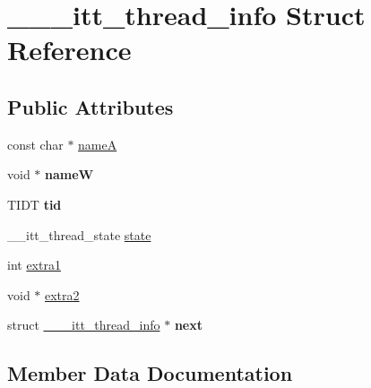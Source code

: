 \hypertarget{struct______itt__thread__info}{}\section{\+\_\+\+\_\+\+\_\+itt\+\_\+thread\+\_\+info Struct Reference}
\label{struct______itt__thread__info}
\subsection*{Public Attributes}
\begin{DoxyCompactItemize}
\item 
const char $\ast$ \hyperlink{struct______itt__thread__info_af0d071b9ab2b86c040a6de800f92cb30}{nameA}
\item 
void $\ast$ {\bfseries nameW}\hypertarget{struct______itt__thread__info_a607067bccd38bfb17c9f7c8676caf03d}{}\label{struct______itt__thread__info_a607067bccd38bfb17c9f7c8676caf03d}

\item 
T\+I\+DT {\bfseries tid}\hypertarget{struct______itt__thread__info_adfe992c44e507418c56b509c9c985393}{}\label{struct______itt__thread__info_adfe992c44e507418c56b509c9c985393}

\item 
\+\_\+\+\_\+itt\+\_\+thread\+\_\+state \hyperlink{struct______itt__thread__info_a6f6f3ed5a462461cc8dc05b650e331ba}{state}
\item 
int \hyperlink{struct______itt__thread__info_a24093b12fcbe313abcf61c449d42d66c}{extra1}
\item 
void $\ast$ \hyperlink{struct______itt__thread__info_a29a043e53a66cc89b62b11f0ad8e7588}{extra2}
\item 
struct \hyperlink{struct______itt__thread__info}{\+\_\+\+\_\+\+\_\+itt\+\_\+thread\+\_\+info} $\ast$ {\bfseries next}\hypertarget{struct______itt__thread__info_a1c1665afb537536190a66931a94ccae8}{}\label{struct______itt__thread__info_a1c1665afb537536190a66931a94ccae8}

\end{DoxyCompactItemize}


\subsection{Member Data Documentation}
